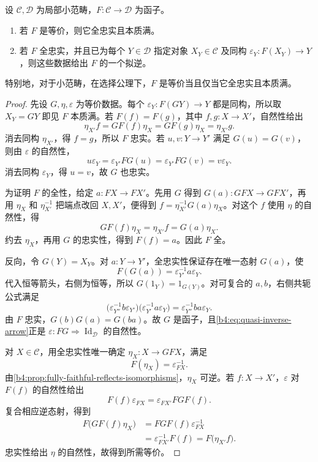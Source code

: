 \begin{theorem}[范畴等价的判据]\label{b4:thm:equivalence-criterion}
	设 \(\mathcal C,\mathcal D\) 为局部小范畴，\(F:\mathcal C\rightarrow\mathcal D\) 为函子。
	\begin{enumerate}
		\item 若 \(F\) 是等价，则它全忠实且本质满。
		\item 若 \(F\) 全忠实，并且已为每个 \(Y\in\mathcal D\) 指定对象 \(X_Y\in\mathcal C\) 及同构 \(\varepsilon_Y:F(X_Y)\rightarrow Y\)，则这些数据给出 \(F\) 的一个拟逆。
	\end{enumerate}
	特别地，对于小范畴，在选择公理下，\(F\) 是等价当且仅当它全忠实且本质满。
\end{theorem}
\begin{proof}
	先设 \(G,\eta,\varepsilon\) 为等价数据。每个 \(\varepsilon_Y:F(GY)\rightarrow Y\) 都是同构，所以取 \(X_Y=GY\) 即见 \(F\) 本质满。若 \(F(f)=F(g)\)，其中 \(f,g:X\rightarrow X'\)，自然性给出
	\[
		\eta_{X'}f=GF(f)\eta_X=GF(g)\eta_X=\eta_{X'}g.
	\]
	消去同构 \(\eta_{X'}\)，得 \(f=g\)，所以 \(F\) 忠实。若 \(u,v:Y\rightarrow Y'\) 满足 \(G(u)=G(v)\)，则由 \(\varepsilon\) 的自然性，
	\[
		u\varepsilon_Y =\varepsilon_{Y'}FG(u) =\varepsilon_{Y'}FG(v) =v\varepsilon_Y.
	\]
	消去同构 \(\varepsilon_Y\)，得 \(u=v\)，故 \(G\) 也忠实。

	为证明 \(F\) 的全性，给定 \(a:FX\rightarrow FX'\)。先用 \(G\) 得到 \(G(a):GFX\rightarrow GFX'\)，再用 \(\eta_X\) 和 \(\eta_{X'}^{-1}\) 把端点改回 \(X,X'\)，便得到 \(f=\eta_{X'}^{-1}G(a)\eta_X\)。对这个 \(f\) 使用 \(\eta\) 的自然性，得
	\[
		GF(f)\eta_X=\eta_{X'}f=G(a)\eta_X.
	\]
	约去 \(\eta_X\)，再用 \(G\) 的忠实性，得到 \(F(f)=a\)。因此 \(F\) 全。

	反向，令 \(G(Y)=X_Y\)。对 \(a:Y\rightarrow Y'\)，全忠实性保证存在唯一态射 \(G(a)\)，使
	\begin{equation}\label{b4:eq:quasi-inverse-arrow}
		F(G(a))=\varepsilon_{Y'}^{-1}a\varepsilon_Y.
	\end{equation}
	代入恒等箭头，右侧为恒等，所以 \(G(1_Y)=1_{G(Y)}\)。对可复合的 \(a,b\)，右侧共轭公式满足
	\[
		\bigl(\varepsilon_{Y''}^{-1}b\varepsilon_{Y'}\bigr) \bigl(\varepsilon_{Y'}^{-1}a\varepsilon_Y\bigr) =\varepsilon_{Y''}^{-1}ba\varepsilon_Y.
	\]
	由 \(F\) 忠实，\(G(b)G(a)=G(ba)\)。故 \(G\) 是函子，且\eqref{b4:eq:quasi-inverse-arrow}正是 \(\varepsilon:FG\Rightarrow\operatorname{Id}_{\mathcal D}\) 的自然性。

	对 \(X\in\mathcal C\)，用全忠实性唯一确定 \(\eta_X:X\rightarrow GFX\)，满足
	\[
		F(\eta_X)=\varepsilon_{FX}^{-1}.
	\]
	由\cref{b4:prop:fully-faithful-reflects-isomorphisms}，\(\eta_X\) 可逆。若 \(f:X\rightarrow X'\)，\(\varepsilon\) 对 \(F(f)\) 的自然性给出
	\[
		F(f)\varepsilon_{FX} =\varepsilon_{FX'}FGF(f).
	\]
	复合相应逆态射，得到
	\[
		\begin{aligned}
			F\bigl(GF(f)\eta_X\bigr) &=FGF(f)\varepsilon_{FX}^{-1}\\
			&=\varepsilon_{FX'}^{-1}F(f) =F\bigl(\eta_{X'}f\bigr).
		\end{aligned}
	\]
	忠实性给出 \(\eta\) 的自然性，故得到所需等价。


\end{proof}
